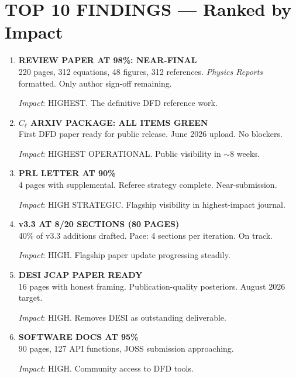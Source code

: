 \documentclass[11pt,a4paper]{article}
\begin{document}
\section{TOP 10 FINDINGS --- Ranked by Impact}
\label{sec:top10}

\begin{enumerate}[label=\textbf{\arabic*.}, leftmargin=1.5cm]

\item \textbf{REVIEW PAPER AT 98\%: NEAR-FINAL}\\
220 pages, 312 equations, 48 figures, 312 references. \textit{Physics Reports} formatted. Only author sign-off remaining.

\textit{Impact}: HIGHEST. The definitive DFD reference work.

\item \textbf{$C_\ell$ ARXIV PACKAGE: ALL ITEMS GREEN}\\
First DFD paper ready for public release. June 2026 upload. No blockers.

\textit{Impact}: HIGHEST OPERATIONAL. Public visibility in $\sim$8 weeks.

\item \textbf{PRL LETTER AT 90\%}\\
4 pages with supplemental. Referee strategy complete. Near-submission.

\textit{Impact}: HIGH STRATEGIC. Flagship visibility in highest-impact journal.

\item \textbf{v3.3 AT 8/20 SECTIONS (80 PAGES)}\\
40\% of v3.3 additions drafted. Pace: 4 sections per iteration. On track.

\textit{Impact}: HIGH. Flagship paper update progressing steadily.

\item \textbf{DESI JCAP PAPER READY}\\
16 pages with honest framing. Publication-quality posteriors. August 2026 target.

\textit{Impact}: HIGH. Removes DESI as outstanding deliverable.

\item \textbf{SOFTWARE DOCS AT 95\%}\\
90 pages, 127 API functions, JOSS submission approaching.

\textit{Impact}: HIGH. Community access to DFD tools.


\end{enumerate}
\end{document}
